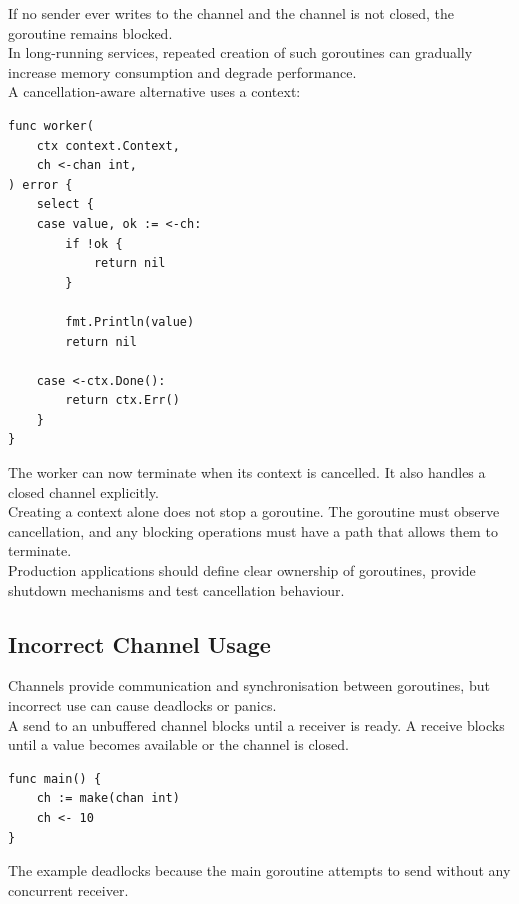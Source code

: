 If no sender ever writes to the channel and the channel is not closed, the goroutine remains blocked.\\

In long-running services, repeated creation of such goroutines can gradually increase memory consumption and degrade performance.\\

A cancellation-aware alternative uses a context:

\begin{lstlisting}
func worker(
    ctx context.Context,
    ch <-chan int,
) error {
    select {
    case value, ok := <-ch:
        if !ok {
            return nil
        }

        fmt.Println(value)
        return nil

    case <-ctx.Done():
        return ctx.Err()
    }
}
\end{lstlisting}

The worker can now terminate when its context is cancelled. It also handles a closed channel explicitly.\\

Creating a context alone does not stop a goroutine. The goroutine must observe cancellation, and any blocking operations must have a path that allows them to terminate.\\

Production applications should define clear ownership of goroutines, provide shutdown mechanisms and test cancellation behaviour.

\subsection{Incorrect Channel Usage}

Channels provide communication and synchronisation between goroutines, but incorrect use can cause deadlocks or panics.\\

A send to an unbuffered channel blocks until a receiver is ready. A receive blocks until a value becomes available or the channel is closed.

\begin{lstlisting}
func main() {
    ch := make(chan int)
    ch <- 10
}
\end{lstlisting}

The example deadlocks because the main goroutine attempts to send without any concurrent receiver.\\

